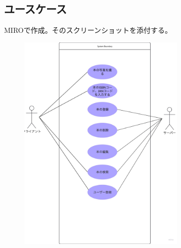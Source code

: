 \documentclass[a4paper, 11pt, titlepage]{jsarticle}
\begin{document}
\subsection{ユースケース}
MIROで作成。そのスクリーンショットを添付する。
\begin{figure}[htbp]
\centering
\includegraphics[width=80mm]{usecase.png}
\label{fig:func}
\end{figure}
\end{document}
